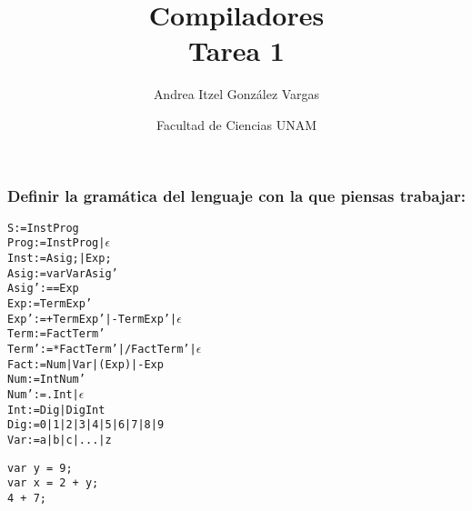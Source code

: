 \documentclass[12pt]{article}
\title{Compiladores \\ Tarea 1}
\author{Andrea Itzel González Vargas}
\date{Facultad de Ciencias UNAM}
\begin{document}
\maketitle

\subsubsection{Definir la gramática del lenguaje con la que piensas trabajar:}
\begin{alltt}
S     := InstProg
Prog  := InstProg | \(\epsilon\)
Inst  := Asig; | Exp;
Asig  := var VarAsig'
Asig' := =Exp
Exp   := TermExp'
Exp'  := +TermExp' | -TermExp' | \(\epsilon\)
Term  := FactTerm'
Term' := *FactTerm' | /FactTerm' | \(\epsilon\)
Fact  := Num | Var | (Exp) | -Exp
Num   := IntNum'
Num'  := .Int | \(\epsilon\)
Int   := Dig | DigInt
Dig   := 0 | 1 | 2 | 3 | 4 | 5 | 6 | 7 | 8 | 9
Var   := a | b | c | ... | z
\end{alltt}

\begin{verbatim}
var y = 9;
var x = 2 + y;
4 + 7;
\end{verbatim}
\end{document}
